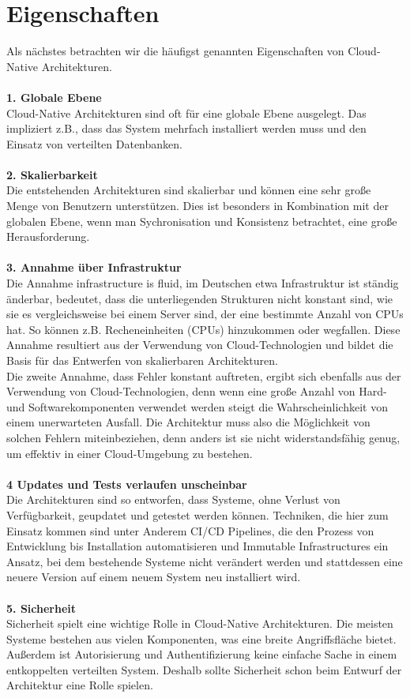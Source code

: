 \section{Eigenschaften}
Als nächstes betrachten wir die häufigst genannten Eigenschaften von Cloud-Native Architekturen.\\
\\
\textbf{1. Globale Ebene}\\
Cloud-Native Architekturen sind oft für eine globale Ebene ausgelegt. Das impliziert z.B., dass das System mehrfach installiert werden muss und den Einsatz von verteilten Datenbanken.\\
\\
\textbf{2. Skalierbarkeit}\\
Die entstehenden Architekturen sind skalierbar und können eine sehr große Menge von Benutzern unterstützen. Dies ist besonders in Kombination mit der globalen Ebene, wenn man Sychronisation und Konsistenz betrachtet, eine große Herausforderung.\\
\\
\textbf{3. Annahme über Infrastruktur}\\
Die Annahme \glqq infrastructure is fluid\grqq{}, im Deutschen etwa Infrastruktur ist ständig änderbar, bedeutet, dass die unterliegenden Strukturen nicht konstant sind, wie sie es vergleichsweise bei einem Server sind, der eine bestimmte Anzahl von CPUs hat. So können z.B. Recheneinheiten (CPUs) hinzukommen oder wegfallen. Diese Annahme resultiert aus der Verwendung von Cloud-Technologien und bildet die Basis für das Entwerfen von skalierbaren Architekturen.\\
Die zweite Annahme, dass Fehler konstant auftreten, ergibt sich ebenfalls aus der Verwendung von Cloud-Technologien, denn wenn eine große Anzahl von Hard- und Softwarekomponenten verwendet werden steigt die Wahrscheinlichkeit von einem unerwarteten Ausfall. Die Architektur muss also die Möglichkeit von solchen Fehlern miteinbeziehen, denn anders ist sie nicht widerstandsfähig genug, um effektiv in einer Cloud-Umgebung zu bestehen.\\
\\
\textbf{4 Updates und Tests verlaufen unscheinbar}\\
Die Architekturen sind so entworfen, dass Systeme, ohne Verlust von Verfügbarkeit, geupdatet und getestet werden können. Techniken, die hier zum Einsatz kommen sind unter Anderem CI/CD Pipelines, die den Prozess von Entwicklung bis Installation automatisieren und Immutable Infrastructures ein Ansatz, bei dem bestehende Systeme nicht verändert werden und stattdessen eine neuere Version auf einem neuem System neu installiert wird.\\
\\
\textbf{5. Sicherheit}\\
Sicherheit spielt eine wichtige Rolle in Cloud-Native Architekturen. Die meisten Systeme bestehen aus vielen Komponenten, was eine breite Angriffsfläche bietet. Außerdem ist Autorisierung und Authentifizierung keine einfache Sache in einem entkoppelten verteilten System. Deshalb sollte Sicherheit schon beim Entwurf der Architektur eine Rolle spielen.

